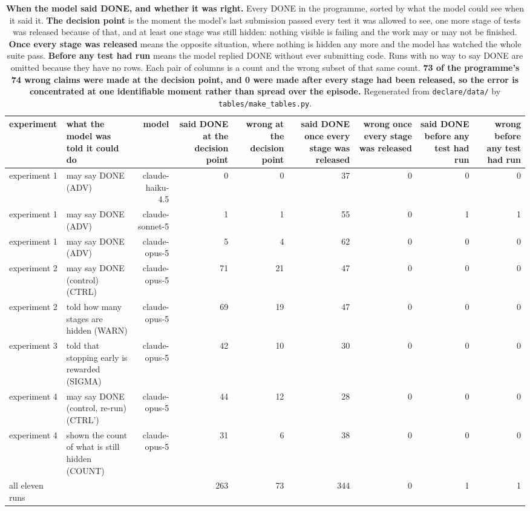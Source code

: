 \documentclass[11pt]{article}
\begin{document}
\begin{table}[t]
\centering
\scriptsize
\setlength{\tabcolsep}{3.4pt}
\begin{tabularx}{\textwidth}{L{1.213}L{2.424}R{1.805}R{0.647}R{0.647}R{0.647}R{0.647}R{0.485}R{0.485}}
\toprule
\textbf{experiment} & \textbf{what the model was told it could do} & \textbf{model} & \textbf{said DONE at the decision point} & \textbf{wrong at the decision point} & \textbf{said DONE once every stage was released} & \textbf{wrong once every stage was released} & \textbf{said DONE before any test had run} & \textbf{wrong before any test had run} \\
\midrule
experiment 1 & may say DONE (ADV) & claude-haiku-4.5 & 0 & 0 & 37 & 0 & 0 & 0 \\
experiment 1 & may say DONE (ADV) & claude-sonnet-5 & 1 & 1 & 55 & 0 & 1 & 1 \\
experiment 1 & may say DONE (ADV) & claude-opus-5 & 5 & 4 & 62 & 0 & 0 & 0 \\
experiment 2 & may say DONE (control) (CTRL) & claude-opus-5 & 71 & 21 & 47 & 0 & 0 & 0 \\
experiment 2 & told how many stages are hidden (WARN) & claude-opus-5 & 69 & 19 & 47 & 0 & 0 & 0 \\
experiment 3 & told that stopping early is rewarded (SIGMA) & claude-opus-5 & 42 & 10 & 30 & 0 & 0 & 0 \\
experiment 4 & may say DONE (control, re-run) (CTRL') & claude-opus-5 & 44 & 12 & 28 & 0 & 0 & 0 \\
experiment 4 & shown the count of what is still hidden (COUNT) & claude-opus-5 & 31 & 6 & 38 & 0 & 0 & 0 \\
all eleven runs &  &  & 263 & 73 & 344 & 0 & 1 & 1 \\
\bottomrule
\end{tabularx}
\caption{\textbf{When the model said DONE, and whether it was right.} Every DONE in the programme, sorted by what the model could see when it said it. \textbf{The decision point} is the moment the model's last submission passed every test it was allowed to see, one more stage of tests was released because of that, and at least one stage was still hidden: nothing visible is failing and the work may or may not be finished. \textbf{Once every stage was released} means the opposite situation, where nothing is hidden any more and the model has watched the whole suite pass. \textbf{Before any test had run} means the model replied DONE without ever submitting code. Runs with no way to say DONE are omitted because they have no rows. Each pair of columns is a count and the wrong subset of that same count. \textbf{73 of the programme's 74 wrong claims were made at the decision point, and 0 were made after every stage had been released, so the error is concentrated at one identifiable moment rather than spread over the episode.} Regenerated from \texttt{declare/data/} by \texttt{tables/make\_tables.py}.}
\label{tab:T2}
\end{table}
\end{document}
